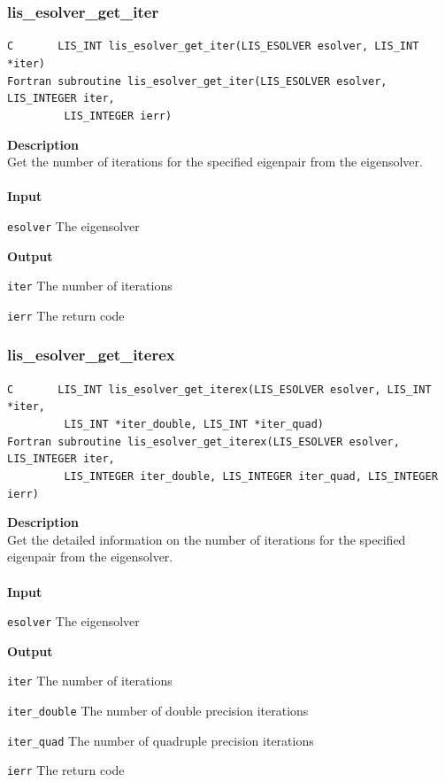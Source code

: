 \documentclass[a4paper]{article}
\newcommand{\namelistlabel}[1]{\mbox{#1}\hfill}
\newenvironment{namelist}[1]{%
\begin{list}{}
  {\let\makelabel\namelistlabel
  \settowidth{\labelwidth}{#1}
  \setlength{\leftmargin}{1.1\labelwidth}}
  }{%
\end{list}}
\begin{document}
\subsubsection{lis\_esolver\_get\_iter}
\begin{screen}
\verb|C       LIS_INT lis_esolver_get_iter(LIS_ESOLVER esolver, LIS_INT *iter)|\\
\verb|Fortran subroutine lis_esolver_get_iter(LIS_ESOLVER esolver, LIS_INTEGER iter,|\\
\verb|         LIS_INTEGER ierr)|
\end{screen}
{\bf Description}\\
\indent
Get the number of iterations for the specified eigenpair from the eigensolver.
\\ \\
\noindent
{\bf Input}
\begin{namelist}{XXXXXXXXXXXXXXXXXXXX}
\item[\tt esolver] The eigensolver
\end{namelist}
{\bf Output}
\begin{namelist}{XXXXXXXXXXXXXXXXXXXX}
\item[\tt iter] The number of iterations
\item[\tt ierr] The return code
\end{namelist}

\newpage
\subsubsection{lis\_esolver\_get\_iterex}
\begin{screen}
\verb|C       LIS_INT lis_esolver_get_iterex(LIS_ESOLVER esolver, LIS_INT *iter,|\\
\verb|         LIS_INT *iter_double, LIS_INT *iter_quad)|\\
\verb|Fortran subroutine lis_esolver_get_iterex(LIS_ESOLVER esolver, LIS_INTEGER iter,|\\
\verb|         LIS_INTEGER iter_double, LIS_INTEGER iter_quad, LIS_INTEGER ierr)|
\end{screen}
{\bf Description}\\
\indent
Get the detailed information on the number of iterations for the specified eigenpair from the eigensolver.
\\ \\
\noindent
{\bf Input}
\begin{namelist}{XXXXXXXXXXXXXXXXXXXX}
\item[\tt esolver] The eigensolver
\end{namelist}
{\bf Output}
\begin{namelist}{XXXXXXXXXXXXXXXXXXXX}
\item[\tt iter] The number of iterations
\item[\tt iter\_double] The number of double precision iterations
\item[\tt iter\_quad] The number of quadruple precision iterations
\item[\tt ierr] The return code
\end{namelist}
\end{document}
